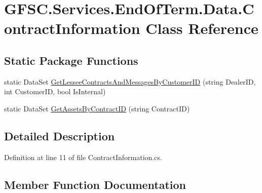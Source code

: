 \hypertarget{class_g_f_s_c_1_1_services_1_1_end_of_term_1_1_data_1_1_contract_information}{}\section{G\+F\+S\+C.\+Services.\+End\+Of\+Term.\+Data.\+Contract\+Information Class Reference}
\label{class_g_f_s_c_1_1_services_1_1_end_of_term_1_1_data_1_1_contract_information}
\subsection*{Static Package Functions}
\begin{DoxyCompactItemize}
\item 
static Data\+Set \mbox{\hyperlink{class_g_f_s_c_1_1_services_1_1_end_of_term_1_1_data_1_1_contract_information_a3c53201f4ff038c8dad549e60f808fac}{Get\+Lessee\+Contracts\+And\+Messages\+By\+Customer\+ID}} (string Dealer\+ID, int Customer\+ID, bool Is\+Internal)
\item 
static Data\+Set \mbox{\hyperlink{class_g_f_s_c_1_1_services_1_1_end_of_term_1_1_data_1_1_contract_information_abe7a5fb3b218e675e1c46450a40f53f2}{Get\+Assets\+By\+Contract\+ID}} (string Contract\+ID)
\end{DoxyCompactItemize}


\subsection{Detailed Description}


Definition at line 11 of file Contract\+Information.\+cs.



\subsection{Member Function Documentation}
\mbox{\label{class_g_f_s_c_1_1_services_1_1_end_of_term_1_1_data_1_1_contract_information_abe7a5fb3b218e675e1c46450a40f53f2}} 

